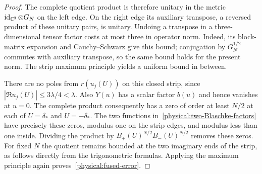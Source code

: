 \begin{proof}
The complete quotient product is therefore unitary in the metric
$\operatorname{id}_{\mathbb C^3}\otimes G_N$ on the left edge. On the right edge its auxiliary
transpose, a reversed product of these unitary pairs, is unitary.
Undoing a transpose in a three-dimensional tensor factor costs at most
three in operator norm. Indeed, its block-matrix expansion and
Cauchy--Schwarz give this bound; conjugation by $G_N^{1/2}$ commutes
with auxiliary transpose, so the same bound holds for the present norm.
The strip maximum principle yields a uniform bound in between.

There are no poles from $r(u_j(U))$ on this closed strip, since
$|\Re u_j(U)|\le3\lambda/4<\lambda$. Also $Y(u)$ has a scalar factor
$b(u)$ and hence vanishes at $u=0$. The complete product consequently
has a zero of order at least $N/2$ at each of $U=\delta_*$ and $U=-\delta_*$.
The two functions in~\eqref{physical:two-Blaschke-factors} have precisely
these zeros, modulus one on the strip edges, and modulus less than one
inside. Dividing the product by
$B_+(U)^{N/2}B_-(U)^{N/2}$ removes these zeros. For fixed $N$ the
quotient remains bounded at the two imaginary ends of the strip,
as follows directly from the trigonometric formulas. Applying the
maximum principle again proves~\eqref{physical:fused-error}.
\end{proof}


